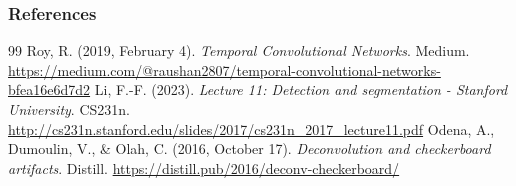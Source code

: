 \documentclass[11pt,compress,t,notes=noshow, xcolor=table]{beamer}
\begin{document}
\begin{vbframe}
\frametitle{References}
\footnotesize{
\begin{thebibliography}{99}
 Roy, R. (2019, February 4). \textit{Temporal Convolutional Networks}. Medium. \url{https://medium.com/@raushan2807/temporal-convolutional-networks-bfea16e6d7d2}
 Li, F.-F. (2023). \textit{Lecture 11: Detection and segmentation - Stanford University}. CS231n. \url{http://cs231n.stanford.edu/slides/2017/cs231n_2017_lecture11.pdf}
Odena, A., Dumoulin, V., \& Olah, C. (2016, October 17). \textit{Deconvolution and checkerboard artifacts}. Distill. \url{https://distill.pub/2016/deconv-checkerboard/}




\end{thebibliography}}
\end{vbframe}
\end{document}
